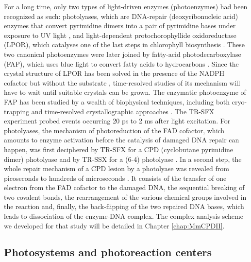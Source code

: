 For a long time, only two types of light-driven enzymes (photoenzymes) had been recognized as such: photolyases, which are DNA-repair (deoxyribonucleic acid) enzymes that convert pyrimidine dimers into a pair of pyrimidine bases under exposure to UV light \parencite{sancarStructureFunctionDNA2003}, and light-dependent protochorophyllide oxidoreductase (LPOR), which catalyses one of the last steps in chlorophyll biosynthesis \parencite{heyesMakingLightWork2005}. These two canonical photoenzymes were later joined by fatty-acid photodecarboxylase (FAP), which uses blue light to convert fatty acids to hydrocarbons \parencite{santoniHierarchicalClusteringMultiplecrystal2017}. Since the crystal structure of LPOR has been solved in the presence of the NADPH cofactor but without the substrate \parencite{zhangStructuralBasisEnzymatic2019}, time-resolved studies of its mechanism will have to wait until suitable crystals can be grown. The enzymatic photoenzyme of FAP has been studied by a wealth of biophysical techniques, including both cryo-trapping and time-resolved crystallographic approaches \parencite{sorigueMechanismDynamicsFatty2021}. The TR-SFX experiment probed events occurring 20 ps to 2 ms after light excitation. For photolyases, the mechanism of photoreduction of the FAD cofactor, which amounts to enzyme activation before the catalysis of damaged DNA repair can happen, was first deciphered by TR-SFX for a CPD (cyclobutane pyrimidine dimer) photolyase \parencite{maestre-reynaSerialCrystallographyCaptures2022} and by TR-SSX for a (6-4) photolyase \parencite{celliniStructuralBasisRadical2022}. In a second step, the whole repair mechanism of a CPD lesion by a photolyase was revealed from picoseconds to hundreds of microseconds \parencite{maestre-reynaVisualizingDNARepair2023a,christouTimeresolvedCrystallographyCaptures2023a}. It consists of the transfer of one electron from the FAD cofactor to the damaged DNA, the sequential breaking of two covalent bonds, the rearrangement of the various chemical groups involved in the reaction and, finally, the back-flipping of the two repaired DNA bases, which leads to dissociation of the enzyme-DNA complex. The complex analysis scheme we developed for that study will be detailed in Chapter \ref{chap:MmCPDII}.

\subsection{Photosystems and photoreaction centers}\label{sec:Photosystems}

